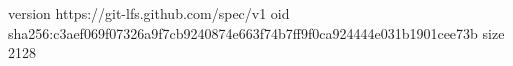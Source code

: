 version https://git-lfs.github.com/spec/v1
oid sha256:c3aef069f07326a9f7cb9240874e663f74b7ff9f0ca924444e031b1901cee73b
size 2128
